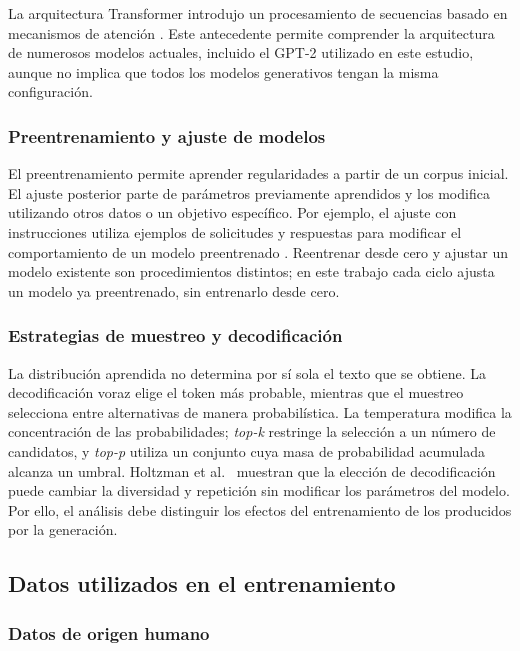 \documentclass[12pt,letterpaper]{article}
\begin{document}
La arquitectura Transformer introdujo un procesamiento de secuencias basado
en mecanismos de atención \cite{vaswani2017}. Este antecedente permite
comprender la arquitectura de numerosos modelos actuales, incluido el GPT-2
utilizado en este estudio, aunque no implica que todos los modelos
generativos tengan la misma configuración.

\subsubsection{Preentrenamiento y ajuste de modelos}

El preentrenamiento permite aprender regularidades a partir de un corpus
inicial. El ajuste posterior parte de parámetros previamente aprendidos y
los modifica utilizando otros datos o un objetivo específico. Por ejemplo,
el ajuste con instrucciones utiliza ejemplos de solicitudes y respuestas
para modificar el comportamiento de un modelo preentrenado
\cite{wang2023selfinstruct}. Reentrenar desde cero y ajustar un modelo
existente son procedimientos distintos; en este trabajo cada ciclo ajusta
un modelo ya preentrenado, sin entrenarlo desde cero.

\subsubsection{Estrategias de muestreo y decodificación}

La distribución aprendida no determina por sí sola el texto que se obtiene.
La decodificación voraz elige el token más probable, mientras que el muestreo
selecciona entre alternativas de manera probabilística. La temperatura
modifica la concentración de las probabilidades; \textit{top-k} restringe
la selección a un número de candidatos, y \textit{top-p} utiliza un conjunto
cuya masa de probabilidad acumulada alcanza un umbral. Holtzman et al.\
\cite{holtzman2020} muestran que la elección de decodificación puede cambiar
la diversidad y repetición sin modificar los parámetros del modelo.
Por ello, el análisis debe distinguir los efectos del entrenamiento de los
producidos por la generación.

\subsection{Datos utilizados en el entrenamiento}

\subsubsection{Datos de origen humano}
\end{document}
